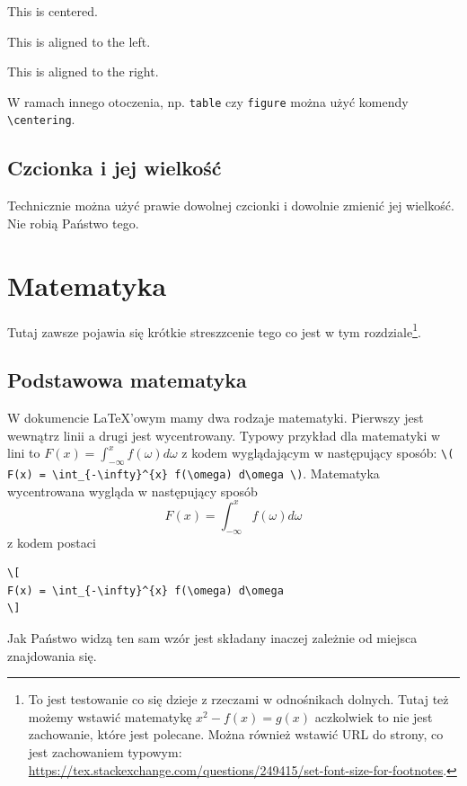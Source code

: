 \documentclass[polish, twoside, 12pt, a4paper]{article}
\theoremstyle{definition}
\theoremstyle{plain}
\theoremstyle{remark}
\begin{document}
\begin{center}
  This is centered.
\end{center}

\begin{flushleft}
  This is aligned to the left.
\end{flushleft}

\begin{flushright}
  This is aligned to the right.
\end{flushright}

W ramach innego otoczenia, np. \verb+table+ czy \verb+figure+ można użyć komendy \verb+\centering+.

\subsection{Czcionka i jej wielkość}

Technicznie można użyć prawie dowolnej czcionki i dowolnie zmienić jej wielkość. Nie robią Państwo tego.

\clearpage
\section{Matematyka}

Tutaj zawsze pojawia się krótkie streszzcenie tego co jest w tym rozdziale\footnote{To jest testowanie co się dzieje z rzeczami w odnośnikach dolnych. Tutaj też możemy wstawić matematykę \( x^2 - f(x) = g(x) \) aczkolwiek to nie jest zachowanie, które jest polecane. Można również wstawić URL do strony, co jest zachowaniem typowym: \url{https://tex.stackexchange.com/questions/249415/set-font-size-for-footnotes}.}.

\subsection{Podstawowa matematyka}

W dokumencie \LaTeX'owym mamy dwa rodzaje matematyki. Pierwszy jest wewnątrz linii a drugi jest wycentrowany. Typowy przykład dla matematyki w lini to  \( F(x) = \int_{-\infty}^{x} f(\omega) d\omega \) z kodem wyglądającym w następujący sposób: \verb!\( F(x) = \int_{-\infty}^{x} f(\omega) d\omega \)!. Matematyka wycentrowana wygląda w następujący sposób
\[
F(x) = \int_{-\infty}^{x} f(\omega) d\omega
\]
z kodem postaci
\begin{verbatim}
\[
F(x) = \int_{-\infty}^{x} f(\omega) d\omega
\]
\end{verbatim}
Jak Państwo widzą ten sam wzór jest składany inaczej zależnie od miejsca znajdowania się.
\end{document}
